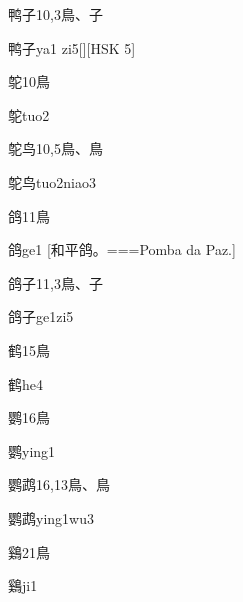 \begin{Entry}{鸭子}{10,3}{⿃、⼦}
  \begin{Phonetics}{鸭子}{ya1 zi5}[][HSK 5]
  \end{Phonetics}
\end{Entry}

\begin{Entry}{鸵}{10}{⿃}
  \begin{Phonetics}{鸵}{tuo2}
  \end{Phonetics}
\end{Entry}

\begin{Entry}{鸵鸟}{10,5}{⿃、⿃}
  \begin{Phonetics}{鸵鸟}{tuo2niao3}
  \end{Phonetics}
\end{Entry}

\begin{Entry}{鸽}{11}{⿃}
  \begin{Phonetics}{鸽}{ge1}
    [和平鸽。===Pomba da Paz.]
  \end{Phonetics}
\end{Entry}

\begin{Entry}{鸽子}{11,3}{⿃、⼦}
  \begin{Phonetics}{鸽子}{ge1zi5}
  \end{Phonetics}
\end{Entry}

\begin{Entry}{鹤}{15}{⿃}
  \begin{Phonetics}{鹤}{he4}
  \end{Phonetics}
\end{Entry}

\begin{Entry}{鹦}{16}{⿃}
  \begin{Phonetics}{鹦}{ying1}
  \end{Phonetics}
\end{Entry}

\begin{Entry}{鹦鹉}{16,13}{⿃、⿃}
  \begin{Phonetics}{鹦鹉}{ying1wu3}
  \end{Phonetics}
\end{Entry}

\begin{Entry}{鷄}{21}{⿃}
  \begin{Phonetics}{鷄}{ji1}
  \end{Phonetics}
\end{Entry}


